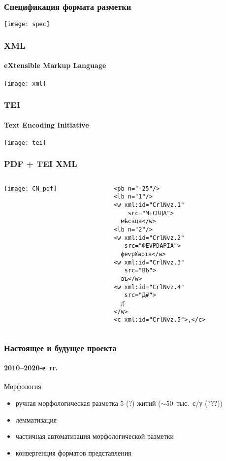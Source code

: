 \begin{frame}
  \frametitle{Спецификация формата разметки}

  \begin{center}
    \texttt{[image: spec]}
  \end{center}
\end{frame}

\begin{frame}
  \frametitle{XML}
  \framesubtitle{eXtensible Markup Language}

  \begin{center}
    \texttt{[image: xml]}
  \end{center}
\end{frame}

\begin{frame}
  \frametitle{TEI}
  \framesubtitle{Text Encoding Initiative}

  \begin{center}
    \texttt{[image: tei]}
  \end{center}
\end{frame}

\begin{frame}[fragile]
  \frametitle{PDF + TEI XML}

  \begin{columns}[c]
    \begin{column}{6cm}
      \texttt{[image: CN\_pdf]}
    \end{column}

    \begin{column}{6cm}
      \begin{Verbatim}[fontsize=\footnotesize]
<pb n="-25"/>
<lb n="1"/>
<w xml:id="CrlNvz.1"
    src="М+СRЦА">
  мѣсѧца</w>
<lb n="2"/>
<w xml:id="CrlNvz.2"
   src="ФЕVРDАРIА">
  феѵрꙋарїа</w>
<w xml:id="CrlNvz.3"
   src="ВЪ">
  въ</w>
<w xml:id="CrlNvz.4"
   src="Д#">
  д҃
</w>
<c xml:id="CrlNvz.5">,</c>
\end{Verbatim}
    \end{column}
  \end{columns}
\end{frame}

\begin{frame}
  \frametitle{Настоящее и будущее проекта}
  \framesubtitle{2010--2020-е~гг.}

  \begin{block}{Морфология}
    \begin{itemize}
      \item ручная морфологическая разметка 5 (?) житий ($\sim$50~тыс.\ с/у (???))
      \item лемматизация\autocite{sipunin:2018}
      \item частичная автоматизация морфологической разметки\autocite{sipunin:2020}
      \item конвергенция форматов представления
    \end{itemize}
  \end{block}
\end{frame}

